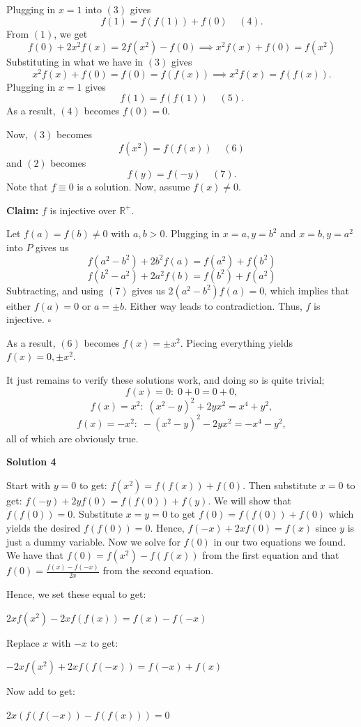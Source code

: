 \begin{enumerate}
 Plugging in $x=1$ into $(3)$ gives
 \[f(1) = f(f(1)) + f(0) \;\;\;\; (4).\]From $(1)$, we get
 \[f(0) + 2x^2f(x) = 2f(x^2)-f(0) \implies x^2f(x)+f(0) = f(x^2)\]Substituting in what we have in $(3)$ gives
 \[x^2f(x)+f(0) = f(0) = f(f(x)) \implies x^2f(x) = f(f(x)).\]Plugging in $x=1$ gives
 \[f(1)=f(f(1)) \;\;\;\; (5).\]As a result, $(4)$ becomes $f(0)=0$.

 Now, $(3)$ becomes
 \[f(x^2) = f(f(x)) \;\;\;\; (6)\]and $(2)$ becomes
 \[f(y)=f(-y) \;\;\;\; (7).\]Note that $f\equiv 0$ is a solution. Now, assume $f(x) \neq 0$.

 \textbf{Claim:} $f$ is injective over $\mathbb{R}^{+}$.

 Let $f(a) = f(b) \neq 0$ with $a,b>0$. Plugging in $x=a, y=b^2$ and $x=b, y=a^2$ into $P$ gives us
 \[f(a^2-b^2)+2b^2f(a) = f(a^2)+f(b^2)\]
 \[f(b^2-a^2)+2a^2f(b) = f(b^2)+f(a^2)\]Subtracting, and using $(7)$ gives us $2(a^2-b^2)f(a) = 0$, which implies that either $f(a)=0$ or $a=\pm b$. Either way leads to contradiction. Thus, $f$ is injective. $\square$

 As a result, $(6)$ becomes $f(x)=\pm x^2$. Piecing everything yields $f(x) = 0, \pm x^2$.

 It just remains to verify these solutions work, and doing so is quite trivial;
 \[f(x)=0:\; 0+0 = 0+0,\]
 \[f(x)=x^2:\; (x^2-y)^2+2yx^2 = x^4+y^2,\]
 \[f(x)=-x^2:\; -(x^2-y)^2-2yx^2 = -x^4-y^2,\]all of which are obviously true.

 



\textbf{Solution 4}

Start with $y = 0$ to get: $f(x^{2}) = f(f(x)) + f(0)$. Then substitute $x = 0$ to get: $f(-y) + 2yf(0) = f(f(0)) + f(y)$. We will show that $f(f(0)) = 0$. Substitute $x = y = 0$ to get $f(0) = f(f(0)) + f(0)$ which yields the desired $f(f(0)) = 0$. Hence, $f(-x) + 2xf(0) = f(x)$ since $y$ is just a dummy variable. Now we solve for $f(0)$ in our two equations we found. We have that $f(0) = f(x^{2}) - f(f(x))$ from the first equation and that $f(0) = \frac{f(x) - f(-x)}{2x}$ from the second equation.

 Hence, we set these equal to get:

 $2xf(x^{2}) - 2xf(f(x)) = f(x) - f(-x)$

 Replace $x$ with $-x$ to get:

 $-2xf(x^{2}) + 2xf(f(-x)) = f(-x) + f(x)$

 Now add to get:

 $2x(f(f(-x)) - f(f(x))) = 0$


\end{enumerate}
